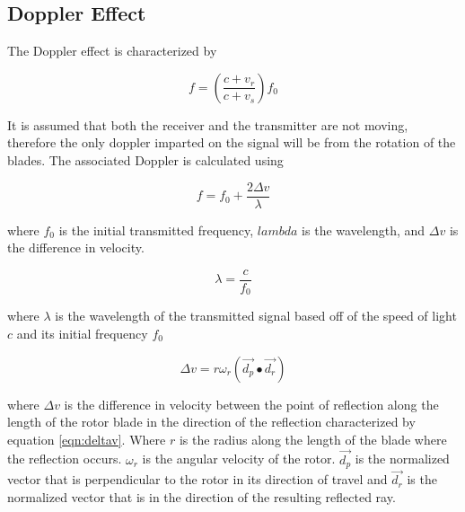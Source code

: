 

\subsection{Doppler Effect}
The Doppler effect is characterized by

\begin{equation}
	f = \left ( \frac{c + v_r}{c + v_s} \right ) f_0
	\label{eqn:formalDop}
\end{equation}

It is assumed that both the receiver and the transmitter are not moving, therefore the only doppler imparted on the signal will be from the rotation of the blades. The associated Doppler is calculated using

\begin{equation}
	f = f_0 + \frac{2\Delta v}{\lambda} %
	\label{eqn:observedShift}	
\end{equation}

where $f_0$ is the initial transmitted frequency, $lambda$ is the wavelength, and $\Delta v$ is the difference in velocity.

\begin{equation}
	\lambda = \frac{c}{f_0}
	\label{eqn:wavelength}
\end{equation}

where $\lambda$ is the wavelength of the transmitted signal based off of the speed of light $c$ and its initial frequency $f_0$

\begin{equation}
	\Delta v = r \omega_r (\vec{d_p} \bullet \vec{d_r})
	\label{eqn:deltav}
\end{equation}

where $\Delta v$ is the difference in velocity between the point of reflection along the length of the rotor blade in the direction of the reflection characterized by equation \ref{eqn:deltav}. Where $r$ is the radius along the length of the blade where the reflection occurs. $\omega_r$ is the angular velocity of the rotor. $\vec{d_p}$ is the normalized vector that is perpendicular to the rotor in its direction of travel and $\vec{d_r}$ is the normalized vector that is in the direction of the resulting reflected ray.


